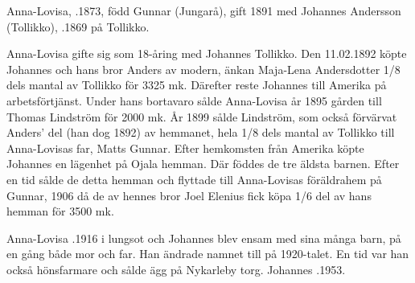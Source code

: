Anna-Lovisa, .1873, född Gunnar (Jungarå), gift 1891 med Johannes Andersson (Tollikko), .1869 på Tollikko.
\begin{jhchildren}
  \item {}
  \item {}
  \item {}
  \item {}
  \item {}
  \item {}
  \item {}
  \item {}
  \item {}
  \item {}
\end{jhchildren}
Anna-Lovisa gifte sig som 18-åring med Johannes Tollikko. Den 11.02.1892 köpte Johannes och hans bror Anders av modern, änkan Maja-Lena Andersdotter 1/8 dels mantal av Tollikko för 3325 mk. Därefter reste Johannes till Amerika på arbetsförtjänst. Under hans bortavaro sålde Anna-Lovisa år 1895 gården till Thomas Lindström för 2000 mk. År 1899 sålde Lindström, som också förvärvat Anders' del (han dog 1892) av hemmanet, hela 1/8 dels mantal av Tollikko till Anna-Lovisas far, Matts Gunnar.
Efter hemkomsten från Amerika köpte Johannes en lägenhet på Ojala hemman. Där föddes de tre äldsta barnen. Efter en tid sålde de detta hemman och flyttade till Anna-Lovisas föräldrahem på Gunnar, 1906 då de av hennes bror Joel Elenius fick köpa 1/6 del av hans hemman för 3500 mk.

Anna-Lovisa .1916 i lungsot och Johannes blev ensam med sina många barn, på en gång både mor och far. Han ändrade namnet till  på 1920-talet. En tid var han också hönsfarmare och sålde ägg på Nykarleby torg. Johannes .1953.




